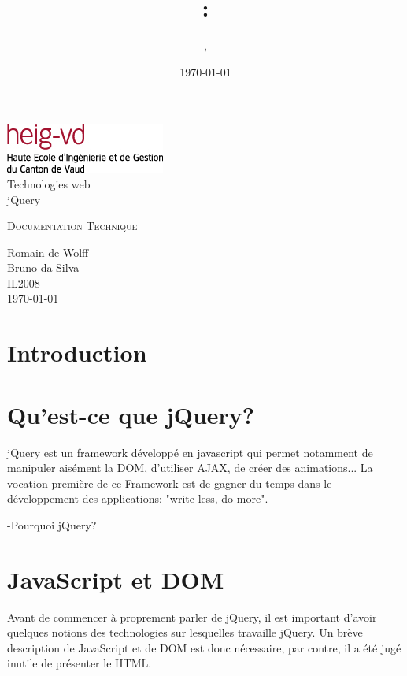 \documentclass[10pt,a4paper,titlepage]{article}
\author{\auteurOne, \auteurTwo}
\title{\branchetag : \laboname}
\date{\today}
\newcommand{\branche}{Technologies web}
\newcommand{\laboname}{jQuery}
\newcommand{\auteurOne}{Romain de Wolff}
\newcommand{\auteurTwo}{Bruno da Silva}
\newcommand{\promo}{IL2008}
\begin{document}
\pagestyle{headings}
\begin{titlepage}
	\begin{center}
	\includegraphics{img/logo-HEIG-VD.jpg}\\
		\vspace{3cm}
		\LARGE \branche %
		\vspace{3cm}\\
		\Huge \laboname \\
		\vspace{3cm}

		\Large \textsc{Documentation Technique} \\
		\vspace{3cm}

		\large \auteurOne \\
		\auteurTwo \\	
		\vspace{10pt}
		\normalsize \textsc{\promo} \\

		\vspace{2cm}
		\today
	\end{center}
\end{titlepage}

\tableofcontents
\newpage
\pagestyle{fancy}
\section{Introduction}


\newpage
\section{Qu'est-ce que jQuery?}
jQuery est un framework développé en javascript qui permet notamment de manipuler aisément la DOM, d'utiliser AJAX, de créer des animations...
La vocation première de ce Framework est de gagner du temps dans le développement des applications: "write less, do more".

-Pourquoi jQuery?

\newpage
\section{JavaScript et DOM}
Avant de commencer à proprement parler de jQuery, il est important d'avoir quelques notions des technologies sur lesquelles travaille jQuery. Un brève description de JavaScript et de DOM est donc nécessaire, par contre, il a été jugé inutile de présenter le HTML.
\end{document}
